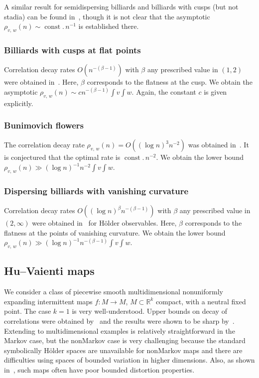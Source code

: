 \documentclass[10pt]{amsart}
\theoremstyle{definition}\newtheorem{defi}[theo]{Definition}\newtheorem{rema}[theo]{Remark}\newtheorem{exam}[theo]{Example}\newtheorem{exem}[theo]{Example}\newtheorem{nota}[theo]{Notation}
\newcommand{\R}{\mathbb{R}}
\DeclareMathOperator{\const}{const}
\begin{document}
A similar result for semidispersing billiards and billiards with cusps (but not stadia) can be found in~\cite{VaientiZhangsub}, though it is not clear that the asymptotic $\rho_{v,\,w}(n)\sim\const.\,n^{-1}$ is established there.


\subsubsection*{Billiards with cusps at flat points}
Correlation decay rates $O(n^{-(\beta-1)})$ with $\beta$ any prescribed value in $(1,2)$ were obtained in~\cite{Zhang17a}. Here, $\beta$ corresponds to the flatness at the cusp. We obtain the asymptotic $\rho_{v,\,w}(n)\sim cn^{-(\beta-1)}\int v\int w$. Again, the constant $c$ is given explicitly.

\vspace{1ex}
\subsubsection*{Bunimovich flowers}
The correlation decay rate $\rho_{v,\,w}(n)=O((\log n)^3n^{-2})$ was obtained in~\cite{ChernovZhang05}. It is conjectured that the optimal rate is $\const.\,n^{-2}$. We obtain the lower bound $\rho_{v,\,w}(n)\gg (\log n)^{-1}n^{-2}\int v\int w$.


\subsubsection*{Dispersing billiards with vanishing curvature} Correlation decay rates $O((\log n)^\beta n^{-(\beta-1)})$ with $\beta$ any prescribed value in $(2,\infty)$ were obtained in~\cite{Zhang17a} for H\"older observables. Here, $\beta$ corresponds to the flatness at the points of vanishing curvature. We obtain the lower bound $\rho_{v,\,w}(n)\gg (\log n)^{-1}n^{-(\beta-1)}\int v\int w$.


\subsection{Hu--Vaienti maps}\label{sec:HuV}

We consider a class of piecewise smooth multidimensional nonuniformly expanding intermittent maps $f:M\to M$, $M\subset\R^k$ compact, with a neutral fixed point. The case $k=1$ is very well-understood. Upper bounds on decay of correlations were obtained by~\cite{Hu04,Young99} and the results were shown to be sharp by~\cite{Gouezel04a,Hu04,Sarig02}. Extending to multidimensional examples is relatively straightforward in the Markov case, but the nonMarkov case is very challenging because the standard symbolically H\"older spaces are unavailable for nonMarkov maps and there are difficulties using spaces of bounded variation in higher dimensions. Also, as shown in~\cite{HuVaienti09}, such maps often have poor bounded distortion properties.
\end{document}
